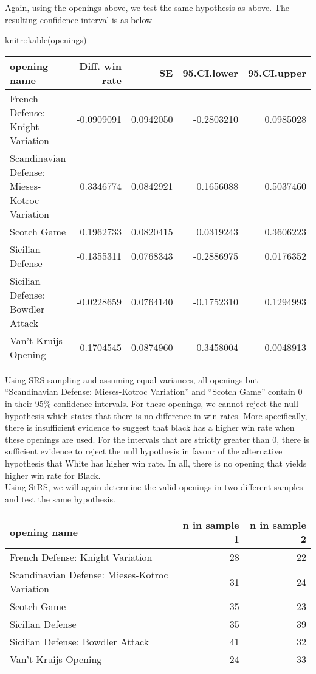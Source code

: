 \documentclass[11pt,]{article}
\newenvironment{Shaded}{\begin{snugshade}}{\end{snugshade}}
\newcommand{\FunctionTok}[1]{\textcolor[rgb]{0.00,0.00,0.00}{#1}}
\newcommand{\NormalTok}[1]{#1}
\newcommand{\SpecialCharTok}[1]{\textcolor[rgb]{0.00,0.00,0.00}{#1}}
\begin{document}
Again, using the openings above, we test the same hypothesis as above.
The resulting confidence interval is as below

\begin{Shaded}
\begin{Highlighting}[]
\NormalTok{knitr}\SpecialCharTok{::}\FunctionTok{kable}\NormalTok{(openings)}
\end{Highlighting}
\end{Shaded}

\begin{tabular}{l|r|r|r|r}
\hline
opening name & Diff. win rate & SE & 95.CI.lower & 95.CI.upper\\
\hline
French Defense: Knight Variation & -0.0909091 & 0.0942050 & -0.2803210 & 0.0985028\\
\hline
Scandinavian Defense: Mieses-Kotroc Variation & 0.3346774 & 0.0842921 & 0.1656088 & 0.5037460\\
\hline
Scotch Game & 0.1962733 & 0.0820415 & 0.0319243 & 0.3606223\\
\hline
Sicilian Defense & -0.1355311 & 0.0768343 & -0.2886975 & 0.0176352\\
\hline
Sicilian Defense: Bowdler Attack & -0.0228659 & 0.0764140 & -0.1752310 & 0.1294993\\
\hline
Van't Kruijs Opening & -0.1704545 & 0.0874960 & -0.3458004 & 0.0048913\\
\hline
\end{tabular}

Using SRS sampling and assuming equal variances, all openings but
``Scandinavian Defense: Mieses-Kotroc Variation'' and ``Scotch Game''
contain 0 in their 95\% confidence intervals. For these openings, we
cannot reject the null hypothesis which states that there is no
difference in win rates. More specifically, there is insufficient
evidence to suggest that black has a higher win rate when these openings
are used. For the intervals that are strictly greater than 0, there is
sufficient evidence to reject the null hypothesis in favour of the
alternative hypothesis that White has higher win rate. In all, there is
no opening that yields higher win rate for Black.\\
\newline Using StRS, we will again determine the valid openings in two
different samples and test the same hypothesis.

\begin{tabular}{l|r|r}
\hline
opening name & n in sample 1 & n in sample 2\\
\hline
French Defense: Knight Variation & 28 & 22\\
\hline
Scandinavian Defense: Mieses-Kotroc Variation & 31 & 24\\
\hline
Scotch Game & 35 & 23\\
\hline
Sicilian Defense & 35 & 39\\
\hline
Sicilian Defense: Bowdler Attack & 41 & 32\\
\hline
Van't Kruijs Opening & 24 & 33\\
\hline
\end{tabular}
\end{document}
